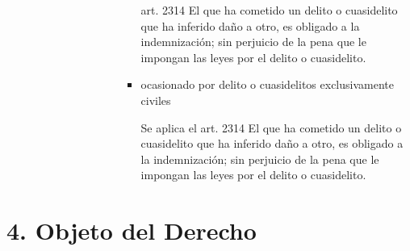 \documentclass[]{article}
\begin{document}
\begin{itemize}
\begin{itemize}
\begin{itemize}
\begin{itemize}
\begin{itemize}
\begin{itemize}
\begin{itemize}
              art. 2314 El que ha cometido un delito o cuasidelito que
              ha inferido daño a otro, es obligado a la indemnización;
              sin perjuicio de la pena que le impongan las leyes por el
              delito o cuasidelito.
            \item
              ocasionado por delito o cuasidelitos exclusivamente
              civiles

              Se aplica el art. 2314 El que ha cometido un delito o
              cuasidelito que ha inferido daño a otro, es obligado a la
              indemnización; sin perjuicio de la pena que le impongan
              las leyes por el delito o cuasidelito.
            \end{itemize}
          \end{itemize}
        \end{itemize}
      \end{itemize}
    \end{itemize}
  \end{itemize}
\end{itemize}

\hypertarget{objeto-del-derecho}{%
\section{4. Objeto del Derecho}\label{objeto-del-derecho}}
\end{document}
